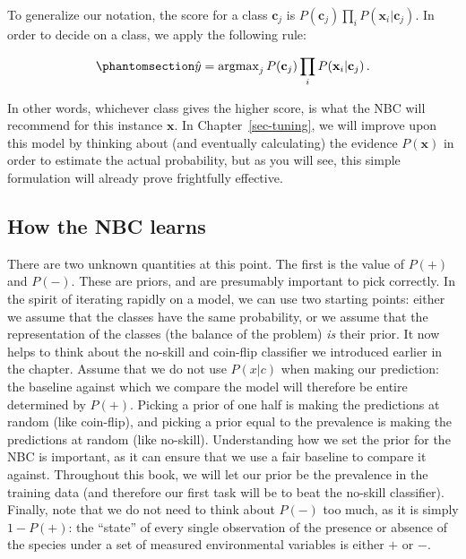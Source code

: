 \documentclass[
  letterpaper,
]{scrbook}
\begin{document}
To generalize our notation, the score for a class \(\mathbf{c}_j\) is
\(P(\mathbf{c}_j)\prod_i P(\mathbf{x}_i|\mathbf{c}_j)\). In order to
decide on a class, we apply the following rule:

\begin{equation}\phantomsection\label{eq-nbc-decision}{
\hat y = \text{argmax}_j \, P(\mathbf{c}_j)\prod_i P(\mathbf{x}_i|\mathbf{c}_j) \,.
}\end{equation}

In other words, whichever class gives the higher score, is what the NBC
will recommend for this instance \(\mathbf{x}\). In
Chapter~\ref{sec-tuning}, we will improve upon this model by thinking
about (and eventually calculating) the evidence \(P(\mathbf{x})\) in
order to estimate the actual probability, but as you will see, this
simple formulation will already prove frightfully effective.

\subsection{How the NBC learns}\label{how-the-nbc-learns}

There are two unknown quantities at this point. The first is the value
of \(P(+)\) and \(P(-)\). These are priors, and are presumably important
to pick correctly. In the spirit of iterating rapidly on a model, we can
use two starting points: either we assume that the classes have the same
probability, or we assume that the representation of the classes (the
balance of the problem) \emph{is} their prior. It now helps to think
about the no-skill and coin-flip classifier we introduced earlier in the
chapter. Assume that we do not use \(P(x|c)\) when making our
prediction: the baseline against which we compare the model will
therefore be entire determined by \(P(+)\). Picking a prior of one half
is making the predictions at random (like coin-flip), and picking a
prior equal to the prevalence is making the predictions at random (like
no-skill). Understanding how we set the prior for the NBC is important,
as it can ensure that we use a fair baseline to compare it against.
Throughout this book, we will let our prior be the prevalence in the
training data (and therefore our first task will be to beat the no-skill
classifier). Finally, note that we do not need to think about \(P(-)\)
too much, as it is simply \(1-P(+)\): the ``state'' of every single
observation of the presence or absence of the species under a set of
measured environmental variables is either \(+\) or \(-\).
\end{document}

